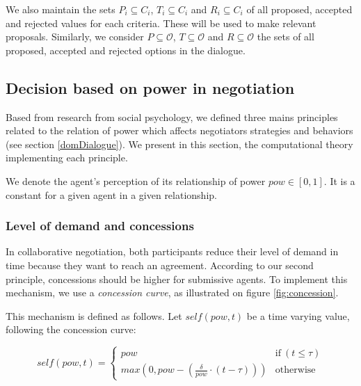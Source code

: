 \documentclass{llncs}
\begin{document}
	We also maintain the sets $P_i \subseteq C_i$, $T_i\subseteq C_i$ and $R_i\subseteq C_i$ of all proposed, accepted and rejected values for each criteria. These will be used to make relevant proposals. Similarly, we consider $P\subseteq \mathcal{O}$, $T\subseteq \mathcal{O}$ and $R\subseteq \mathcal{O}$ the sets of all proposed, accepted and rejected options in the dialogue.
	

	
	\subsection{Decision based on power in negotiation}
	\label{sec:decision}
	Based from research from social psychology, we defined three mains principles related to the relation of power which affects negotiators strategies and behaviors (see section \ref{domDialogue}). We present in this section, the computational theory implementing each principle. 
	
		We denote the agent's perception of its relationship of power $pow \in [0, 1] $. It is a constant for a given agent in a given relationship.
	
	\subsubsection{Level of demand and concessions}
	In collaborative negotiation, both participants reduce their level of demand in time because they want to reach an agreement. According to our second principle, concessions should be higher for submissive agents. To implement this mechanism, we use a \emph{concession curve}, as illustrated on figure \ref{fig:concession}.
	
	 
	 This mechanism is defined as follows. Let $self(pow, t)$ be a time varying value, following the concession curve:
	 
	 \begin{equation}
	 self(pow, t) = \left\{\begin{array}{ll}
	 pow & \mathrm{if\ } (t \leq \tau)\\
	 max(0, pow - (\frac{\delta}{pow} \cdot (t - \tau))) & \mathrm{otherwise}
	 \end{array}\right.
	 \end{equation}
	 
\end{document}
